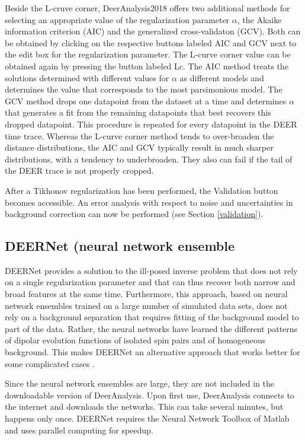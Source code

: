 \documentclass{article}
\begin{document}
Beside the L-cruve corner, DeerAnalysis2018 offers two additional methods for selecting an appropriate value of the regularization parameter $\alpha$, the Akaike information criterion (AIC) and the generalized cross-validaton (GCV)\cite{edwards2018}. Both can be obtained by clicking on the respective buttons labeled {\ttfamily AIC} and {\ttfamily GCV} next to the edit box for the regularization parameter. The L-curve corner value can be obtained again by pressing the button labeled {\ttfamily Lc}. The AIC method treats the solutions determined with different values for $\alpha$ as different models and determines the value that corresponds to the most parsimonious model. The GCV method drops one datapoint from the dataset at a time and determines $\alpha$ that generates a fit from the remaining datapoints that best recovers this dropped datapoint. This procedure is repeated for every datapoint in the DEER time trace. Whereas the L-curve corner method  tends to over-broaden the distance distributions, the AIC and GCV typically result in much sharper distributions, with a tendency to underbroaden. They also can fail if the tail of the DEER trace is not properly cropped.

After a Tikhonov regularization has been performed, the {\ttfamily Validation} button becomes accessible. An error analysis with respect to noise and uncertainties in background correction can now be performed (see Section \ref{validation}).

\subsection{DEERNet (neural network ensemble}
\label{sec:DEERNet}

DEERNet provides a solution to the ill-posed inverse problem that does not rely on a single regularization parameter and that can thus recover both narrow and broad features at the same time. Furthermore, this approach, based on neural network ensembles trained on a large number of simulated data sets, does not rely on a background separation that requires fitting of the background model to part of the data. Rather, the neural networks have learned the different patterns of dipolar evolution functions of isolated spin pairs and of homogeneous background. This makes DEERNet an alternative approach that works better for some complicated cases \cite{worswick2018}.

Since the neural network ensembles are large, they are not included in the downloadable version of DeerAnalysis. Upon first use, DeerAnalysis connects to the internet and downloads the networks. This can take several minutes, but happens only once. DEERNet requires the Neural Network Toolbox of Matlab and uses parallel computing for speedup.
\end{document}
